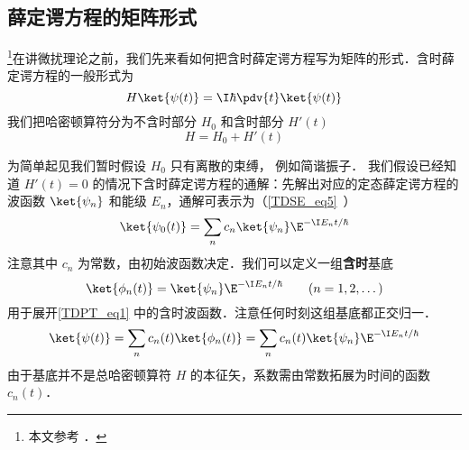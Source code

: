 

\subsection{薛定谔方程的矩阵形式}
\footnote{本文参考 \cite{GriffQ}．}在讲微扰理论之前，我们先来看如何把含时薛定谔方程写为矩阵的形式．含时薛定谔方程的一般形式为
\begin{equation}\label{TDPT_eq1}
H \ket{\psi(t)} = \I\hbar \pdv{t} \ket{\psi(t)}
\end{equation}
我们把哈密顿算符分为不含时部分 $H_0$ 和含时部分 $H'(t)$
\begin{equation}
H = H_0 + H'(t)
\end{equation}

为简单起见我们暂时假设 $H_0$ 只有离散的束缚， 例如简谐振子． 我们假设已经知道 $H'(t) = 0$ 的情况下含时薛定谔方程的通解：先解出对应的定态薛定谔方程的波函数 $\ket{\psi_n}$ 和能级 $E_n$，通解可表示为（\autoref{TDSE_eq5}~）
\begin{equation}
\ket{\psi_0(t)} = \sum_n c_n \ket{\psi_n} \E^{-\I E_n t/\hbar}
\end{equation}
注意其中 $c_n$ 为常数，由初始波函数决定．我们可以定义一组\textbf{含时}基底
\begin{equation}
\ket{\phi_n(t)} = \ket{\psi_n} \E^{-\I E_n t/\hbar} \qquad (n = 1, 2, \dots)
\end{equation}
用于展开\autoref{TDPT_eq1} 中的含时波函数．注意任何时刻这组基底都正交归一．
\begin{equation}
\ket{\psi(t)} = \sum_n c_n(t) \ket{\phi_n(t)} = \sum_n c_n(t) \ket{\psi_n} \E^{-\I E_n t/\hbar}
\end{equation}
由于基底并不是总哈密顿算符 $H$ 的本征矢，系数需由常数拓展为时间的函数 $c_n(t)$．

